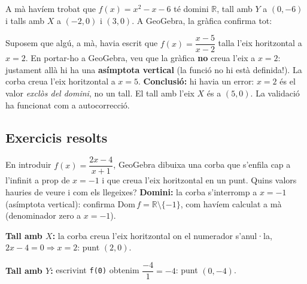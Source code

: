 \begin{exemple}
A mà havíem trobat que $f(x)=x^2-x-6$ té domini $\mathbb{R}$, tall amb $Y$ a
$(0,-6)$ i talls amb $X$ a $(-2,0)$ i $(3,0)$. A GeoGebra, la gràfica confirma tot:

\begin{center}

\end{center}
\end{exemple}

\begin{exemple}
Suposem que algú, a mà, havia escrit que $f(x)=\dfrac{x-5}{x-2}$ talla l'eix
horitzontal a $x=2$. En portar-ho a GeoGebra, veu que la gràfica \textbf{no} creua
l'eix a $x=2$: justament allà hi ha una \textbf{asímptota vertical} (la funció no hi
està definida!). La corba creua l'eix horitzontal a $x=5$. \textbf{Conclusió:} hi
havia un error: $x=2$ és el valor \emph{exclòs del domini}, no un tall. El tall amb
l'eix $X$ és a $(5,0)$. La validació ha funcionat com a autocorrecció.
\end{exemple}

\subsection{Exercicis resolts}

\begin{exresolt}
En introduir $f(x)=\dfrac{2x-4}{x+1}$, GeoGebra dibuixa una corba que s'enfila cap a
l'infinit a prop de $x=-1$ i que creua l'eix horitzontal en un punt. Quins valors
hauries de veure i com els llegeixes?
\solucio
\textbf{Domini:} la corba s'interromp a $x=-1$ (asímptota vertical): confirma
$\mathrm{Dom}\,f=\mathbb{R}\setminus\{-1\}$, com havíem calculat a mà (denominador
zero a $x=-1$).

\textbf{Tall amb $X$:} la corba creua l'eix horitzontal on el numerador s'anul·la,
$2x-4=0 \Rightarrow x=2$: punt $(2,0)$.

\textbf{Tall amb $Y$:} escrivint \texttt{f(0)} obtenim $\dfrac{-4}{1}=-4$: punt
$(0,-4)$.
\end{exresolt}

